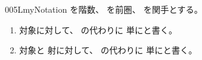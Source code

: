 \documentclass[index]{subfiles}
\begin{document}
\begin{myBlock}{005L}{myNotation}
  を階数、
  を前圏、
  を関手とする。
  \begin{enumerate}
  \item 対象に対して、
    の代わりに
    単にと書く。
  \item 対象と
    射に対して、
    の代わりに
    単にと書く。
  \end{enumerate}
\end{myBlock}
\end{document}
